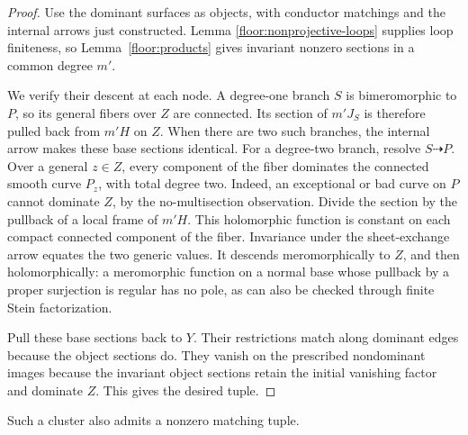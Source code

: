 \begin{proof}
Use the dominant surfaces as objects, with conductor matchings
and the internal arrows just constructed.  Lemma
\ref{floor:nonprojective-loops} supplies loop finiteness, so
Lemma~\ref{floor:products} gives invariant nonzero sections
in a common degree $m'$.

We verify their descent at each node.  A degree-one branch
$S$ is bimeromorphic to $P$, so its general fibers over $Z$
are connected.  Its section of $m'J_S$ is therefore pulled
back from $m'H$ on $Z$.  When there are two such branches,
the internal arrow makes these base sections identical.
For a degree-two branch, resolve $S\dashrightarrow P$.
Over a general $z\in Z$, every component of the fiber
dominates the connected smooth curve $P_z$, with total
degree two.  Indeed, an exceptional or bad curve on $P$
cannot dominate $Z$, by the no-multisection observation.
Divide the section by the pullback of a local frame of
$m'H$.  This holomorphic function is constant on each
compact connected component of the fiber.  Invariance under
the sheet-exchange arrow equates the two generic values.
It descends meromorphically to $Z$, and then holomorphically:
a meromorphic function on a normal base whose pullback by a
proper surjection is regular has no pole, as can also be
checked through finite Stein factorization.

Pull these base sections back to $Y$.  Their restrictions
match along dominant edges because the object sections do.
They vanish on the prescribed nondominant images because
the invariant object sections retain the initial vanishing
factor and dominate $Z$.  This gives the desired tuple.
\end{proof}

\begin{lemma}[Matching in non-Moishezon clusters with $r=0$]
\label{floor:nonprojective-r0}
Such a cluster also admits a nonzero matching tuple.
\end{lemma}

